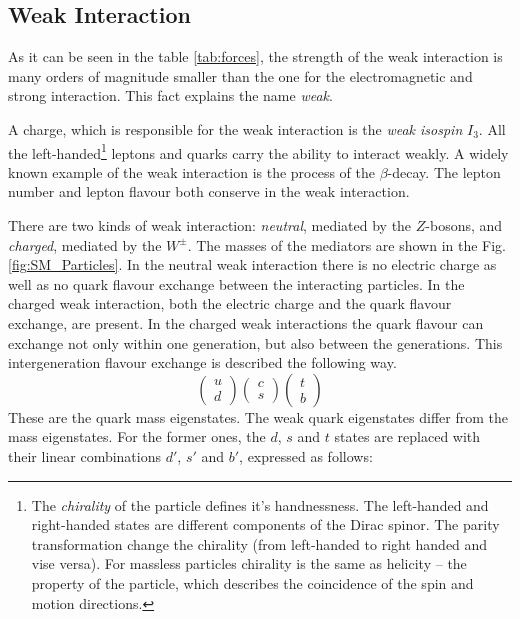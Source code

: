 \subsection{Weak Interaction}

As it can be seen in the table \ref{tab:forces}, the strength of the weak interaction is many orders of magnitude smaller than the one for the 
electromagnetic and strong interaction. This fact explains the name \textit{weak}.

A charge, which is responsible for the weak interaction is the \textit{weak isospin} $I_{3}$. All the left-handed\footnote{The 
\textit{chirality} of the particle defines it's handnessness. The left-handed and right-handed states are different components of the Dirac spinor\cite{aitchison2003gauge}. 
The parity transformation change the chirality (from left-handed to right handed and vise versa). For massless particles chirality is the same as helicity 
-- the property of the particle, which describes the coincidence of the spin and motion directions.} leptons and quarks carry the ability to interact
weakly.
A widely known example of the weak interaction is the process of the $\beta$-decay. The lepton number and lepton flavour both conserve in the weak interaction.

There are two kinds of weak interaction: \textit{neutral}, mediated by the 
$Z$-bosons, and \textit{charged}, mediated by the $W^{\pm}$. The masses of the 
mediators are shown in the Fig. \ref{fig:SM_Particles}.	In the neutral weak interaction there is no electric charge as well as no quark flavour exchange between the 
interacting particles. In the charged weak interaction, both the electric charge and the quark flavour exchange, are present.  
In the charged weak interactions the quark flavour can exchange not only within one generation, but also between the generations.
This intergeneration flavour exchange is described the following way. 
\begin{equation}
\left( \begin{array}{c}
       u \\ d
      \end{array} \right)
\left( \begin{array}{c}
       c \\ s
      \end{array} \right)
\left( \begin{array}{c}
       t \\ b
      \end{array} \right)
\end{equation}
These are the quark mass eigenstates. The weak quark eigenstates differ from the mass eigenstates. For the former ones, the $d$, $s$ and $t$ states are replaced with 
their linear combinations $d'$, $s'$ and $b'$, expressed as follows:

